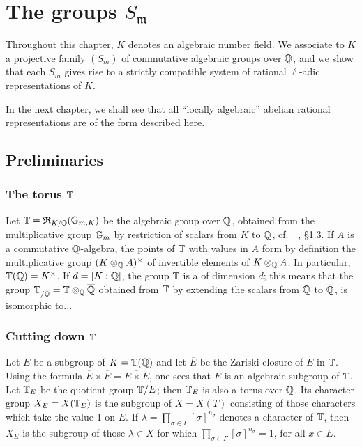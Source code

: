 \chapter{The groups \texorpdfstring{$S_{\mathfrak{m}}$}{Sm}}
\label{ch:ii}

Throughout this chapter,
\dpage
$K$ denotes an algebraic number field.
We associate to $K$ a projective family $(S_m)$ of commutative 
algebraic groups over $\mathbb{Q}$, and we show that each $S_m$ gives rise to a
strictly compatible system of rational $\ell$-adic representations of $K$.

In the next chapter, we shall see that all ``locally algebraic''
abelian rational representations are of the form described here.

\section{Preliminaries}

\subsection{The torus $\mathbb{T}$}
\label{sec:II_11}
Let $\mathbb{T} = \operatorname{\mathfrak{R}}_{K/\mathbb{Q}}(\mathbb{G}_{m, K})$
be the algebraic group over $\mathbb{Q}$, obtained from the multiplicative group
$\mathbb{G}_m$ by restriction of scalars from $K$ to $\mathbb{Q}$, cf.\ 
\citeauthor{43}~\cite{43}, \S 1.3. If $A$ is a commutative $\mathbb{Q}$-algebra, the
points of $\mathbb{T}$ with values in $A$ form by definition the multiplicative group
$(K \otimes_{\mathbb{Q}} A)^\times$ of invertible elements of $K \otimes_{\mathbb{Q}} A$.
In particular, $\mathbb{T}(\mathbb{Q}) = K^\times$. If $d = [K : \mathbb{Q}]$, the group $\mathbb{T}$ is a
\strong{torus}\index{Torus} of dimension $d$; this means that the group
$\mathbb{T}_{/\overline{\mathbb{Q}}} = \mathbb{T} \otimes_{\mathbb{Q}} \overline{\mathbb{Q}}$ obtained from $\mathbb{T}$ by extending
the scalars from $\mathbb{Q}$ to $\overline{\mathbb{Q}}$, is isomorphic
\dpage
to...

\subsection{Cutting down $\mathbb{T}$}
\label{sec:II_12}
Let $E$ be a subgroup of $K = \mathbb{T}(\mathbb{Q})$ and let $\overline{E}$ be the Zariski
closure of $E$ in $\mathbb{T}$. Using the formula $\overline{E} \times \overline{E} =
\overline{E \times E}$, one sees that $E$ is an algebraic subgroup of $\mathbb{T}$.
Let $\mathbb{T}_E$ be the quotient group $\mathbb{T}/E$; then $\mathbb{T}_E$ is also a torus over
$\mathbb{Q}$. Its character group $X_E = X(\mathbb{T}_E)$ is the subgroup of $X = X(T)$
consisting of those characters which take the value 1 on $E$.
If $\lambda = \prod_{\sigma \in \Gamma} [\sigma]^{n_\sigma}$ denotes a
character of $\mathbb{T}$, then $X_E$ is the subgroup of those $\lambda \in X$ for which
$\prod_{\sigma \in \Gamma} [\sigma]^{n_\sigma} = 1$, for all $x \in E$.

